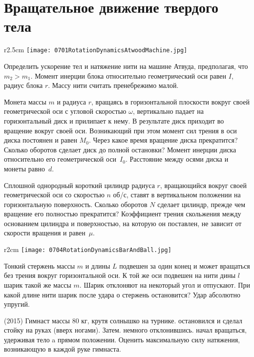 \section{Вращательное движение твердого тела}

\begin{wrapfigure}{r}{2.5cm}
\texttt{[image: 0701RotationDynamicsAtwoodMachine.jpg]}
\end{wrapfigure}

\AddProb Определить ускорение тел и натяжение нити на машине Атвуда, предполагая, что $m_2>m_1$. 
Момент инерции блока относительно геометрический оси равен $I$, радиус блока $r$. Массу нити считать пренебрежимо малой. 

\AddProb Монета массы $m$ и радиуса $r$, вращаясь в горизонтальной плоскости вокруг своей геометрической оси с угловой скоростью $\omega$, 
вертикально падает на горизонтальный диск и прилипает к нему. В результате диск приходит во вращение вокруг своей оси. 
Возникающий при этом момент сил трения в оси диска постоянен и равен $M_0$. Через какое время вращение диска прекратится? 
Сколько оборотов сделает диск до полной остановки? Момент инерции диска относительно его геометрической оси~$I_0$. 
Расстояние между осями диска и монеты равно~$d$.

\AddProb Сплошной однородный короткий цилиндр радиуса $r$, вращающийся вокруг своей геометрической оси со скоростью $n$ об/с, 
ставят в вертикальном положении на горизонтальную поверхность. Сколько оборотов $N$ сделает цилиндр, прежде чем вращение его полностью прекратится? 
Коэффициент трения скольжения между основанием цилиндра и поверхностью, на которую он поставлен, не зависит от скорости вращения и равен~$\mu$.

\begin{wrapfigure}{r}{2cm}
\texttt{[image: 0704RotationDynamicsBarAndBall.jpg]}
\end{wrapfigure}

\AddProb Тонкий стержень массы $m$ и длины $L$ подвешен за один конец и может вращаться без трения вокруг горизонтальной оси. 
К той же оси подвешен на нити дины $l$ шарик такой же массы $m$. Шарик отклоняют на некоторый угол и отпускают. 
При какой длине нити шарик после удара о стержень остановится? Удар абсолютно упругий.

\AddProb (2015) Гимнаст массы 80 кг, крутя солнышко на турнике. остановился и сделал стойку на руках (вверх ногами). Затем. немного отклонившись. начал вращаться, удерживая тело a прямом положении. Оценить максимальную силу натяжения, возникающую в каждой руке гимнаста.

